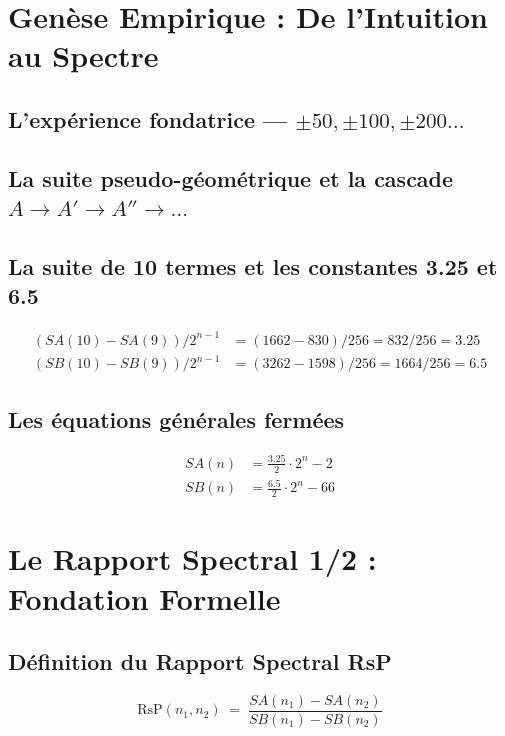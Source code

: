 \documentclass[11pt,a4paper]{article}
\begin{document}
\section{Genèse Empirique : De l'Intuition au Spectre}

\subsection{L'expérience fondatrice --- $\pm 50, \pm 100, \pm 200\ldots$}
\subsection{La suite pseudo-géométrique et la cascade $A \to A' \to A'' \to \ldots$}
\subsection{La suite de 10 termes et les constantes 3.25 et 6.5}
\label{hol:constantes_savard}

\begin{align}
(SA(10) - SA(9))/2^{n-1} &= (1662 - 830)/256 = 832/256 = 3.25 \\
(SB(10) - SB(9))/2^{n-1} &= (3262 - 1598)/256 = 1664/256 = 6.5
\end{align}

\subsection{Les équations générales fermées}
\label{hol:equations_fermees}
\begin{align}
SA(n) &= \frac{3.25}{2} \cdot 2^n - 2 \\
SB(n) &= \frac{6.5}{2}  \cdot 2^n - 66
\end{align}

\section{Le Rapport Spectral 1/2 : Fondation Formelle}

\subsection{Définition du Rapport Spectral RsP}
\label{hol:rsp_definition}
\[
\text{RsP}(n_1, n_2) \;=\; \frac{SA(n_1) - SA(n_2)}{SB(n_1) - SB(n_2)}
\]
\end{document}
